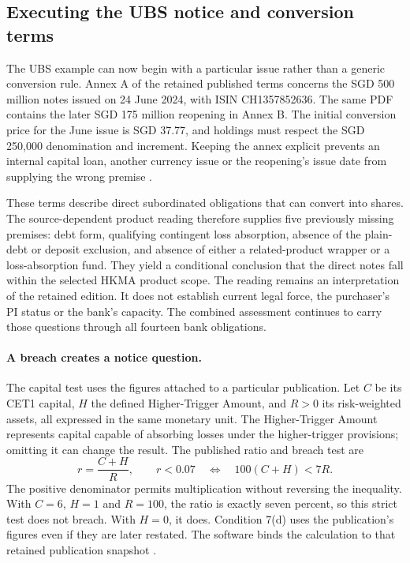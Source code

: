 \subsection{Executing the UBS notice and conversion terms}
\label{sec:ubs-terms}

The UBS example can now begin with a particular issue rather than a generic
conversion rule. Annex A of the retained published terms concerns the
SGD 500 million notes issued on 24 June 2024, with ISIN CH1357852636.
The same PDF contains the later SGD 175 million reopening in Annex B.
The initial conversion price for the June issue is SGD 37.77, and holdings
must respect the SGD 250,000 denomination and increment. Keeping the annex
explicit prevents an internal capital loan, another currency issue or the
reopening's issue date from supplying the wrong premise
\citep[Annex A, definitions and condition~2]{ubsat12024}.

These terms describe direct subordinated obligations that can convert into
shares. The source-dependent product reading therefore supplies five previously
missing premises: debt form, qualifying contingent loss absorption, absence of
the plain-debt or deposit exclusion, and absence of either a related-product
wrapper or a loss-absorption fund. They yield a conditional conclusion that the
direct notes fall within the selected HKMA product scope. The reading remains
an interpretation of the retained edition. It does not establish current legal
force, the purchaser's PI status or the bank's capacity. The combined assessment
continues to carry those questions through all fourteen bank obligations.

\paragraph{A breach creates a notice question.}
The capital test uses the figures attached to a particular publication.
Let $C$ be its CET1 capital, $H$ the defined Higher-Trigger Amount, and $R>0$
its risk-weighted assets, all expressed in the same monetary unit. The
Higher-Trigger Amount represents capital capable of absorbing losses under
the higher-trigger provisions; omitting it can change the result. The
published ratio and breach test are
\begin{equation}
  r=\frac{C+H}{R},\qquad
  r<0.07\quad\Longleftrightarrow\quad 100(C+H)<7R.
  \label{eq:ubs-trigger-ratio}
\end{equation}
The positive denominator permits multiplication without reversing the
inequality. With $C=6$, $H=1$ and $R=100$, the ratio is exactly seven percent,
so this strict test does not breach. With $H=0$, it does. Condition 7(d)
uses the publication's figures even if they are later restated. The software
binds the calculation to that retained publication snapshot
\citep[definition of Trigger CET1 Ratio; conditions~7(b), 7(d)]{ubsat12024}.

